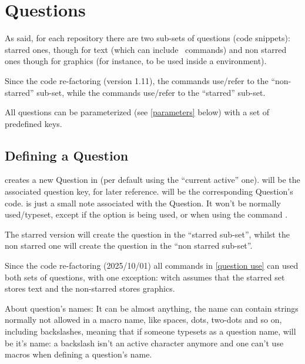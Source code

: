 \documentclass[10pt]{article}
\begin{document}
\section{Questions}
As said, for each repository there are two sub-sets of questions (code snippets): starred ones, though for text (which can include \LaTeXe\ commands) and non starred ones though for graphics (for instance, to be used inside a  environment). 

Since the code re-factoring (version 1.11), the commands  use/refer to the ``non-starred'' sub-set, while the commands  use/refer to the ``starred'' sub-set.

 All questions can be parameterized (see \ref{parameters} below) with a set of predefined keys.

\subsection{Defining a Question}\label{question definition}
\begin{codedescribe}{}
\begin{codesyntax}%
\end{codesyntax}
 creates a new Question in  (per default using the ``current active'' one).  will be the associated question key, for later reference.  will be the corresponding Question's code.  is just a small note associated with the Question. It won't be normally used/typeset, except if the  option is being used, or when using the command \tsobj{\QuestionsList}.

The starred version  will create the question in the ``starred sub-set'', whilst the non starred one  will create the question in the ``non starred sub-set''. 
\end{codedescribe}
\begin{tsremark}
  Since the code re-factoring (2025/10/01) all commands in \ref{question use} can used both sets of questions, with one exception: \tsobj{\QuestionsList} witch assumes that the starred set stores text and the non-starred stores  graphics.
\end{tsremark}
\begin{tsremark}
About question's names: It can be almost anything, the name can contain strings normally not allowed in a macro name, like spaces, dots, two-dots and so on, including backslashes, meaning that if someone typesets \tsobj{\XYZ} as a question name, \tsobj{\XYZ} will be it's name: a backslash isn't an active character anymore and one can't use macros when defining a question's name.
\end{tsremark}
\end{document}
